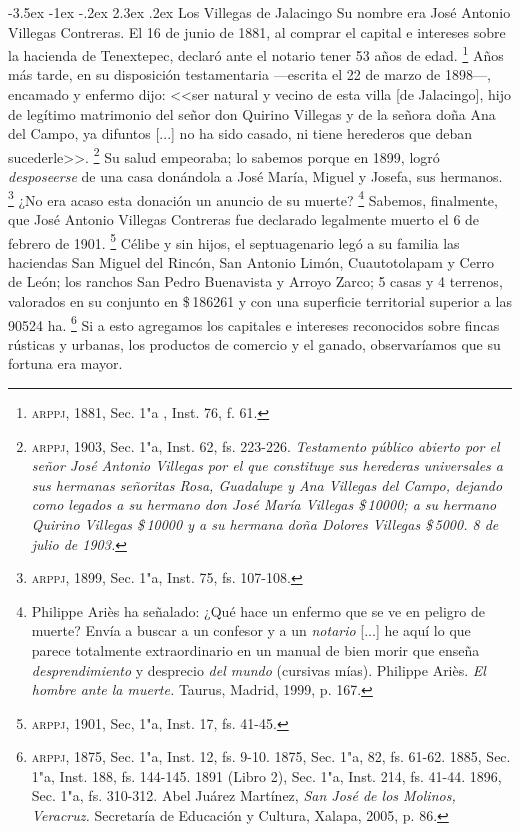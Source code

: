 \documentclass[14pt,twoside,final]{extbook} %
\makeatletter
\let\oldfootnote\footnote
\renewcommand\footnote[1]{%
\oldfootnote{\hspace{1mm}#1}}
\renewcommand\section{\@startsection {section}{1}{\z@}%
                                     {-3.5ex \@plus -1ex \@minus -.2ex}%
                                     {2.3ex \@plus .2ex}%
                                     {\normalfont\large\bfseries\sc}}
\makeatother
\begin{document}
\section{Los Villegas de Jalacingo}\label{sec:Villegas-Jalacingo}
Su nombre era José Antonio Villegas Contreras. El 16 de junio de 1881, al comprar el capital e intereses sobre la hacienda de Tenextepec, declaró ante el notario tener 53 años de edad.\footnote{\textsc{arppj}, 1881, Sec. 1"a , Inst. 76, f. 61.} Años más tarde, en su disposición testamentaria ---escrita el 22 de marzo de 1898---, encamado y enfermo dijo: <<ser natural y vecino de esta villa [de Jalacingo], hijo de legítimo matrimonio del señor don Quirino Villegas y de la señora doña Ana del Campo, ya difuntos [...] no ha sido casado, ni tiene herederos que deban sucederle>>.\footnote{\textsc{arppj}, 1903, Sec. 1"a, Inst. 62, fs. 223-226. \emph{Testamento público abierto por el señor José Antonio Villegas por el que constituye sus herederas universales a sus hermanas señoritas Rosa, Guadalupe y Ana Villegas del Campo, dejando como legados a su hermano don José María Villegas \$\,10000; a su hermano Quirino Villegas \$\,10000 y a su hermana doña Dolores Villegas \$\,5000. 8 de julio de 1903.}} Su salud empeoraba; lo sabemos porque en 1899, logró \emph{desposeerse} de una casa donándola a José María, Miguel y Josefa, sus hermanos.\footnote{\textsc{arppj}, 1899, Sec. 1"a, Inst. 75, fs. 107-108.} ¿No era acaso esta donación un anuncio de su muerte?\footnote{Philippe Ariès ha señalado: ¿Qué hace un enfermo que se ve en peligro de muerte? Envía a buscar a un confesor y a un \emph{notario} [...] he aquí lo que parece totalmente extraordinario en un manual de bien morir que enseña \emph{desprendimiento} y desprecio \emph{del mundo} (cursivas mías). Philippe Ariès. \emph{El hombre ante la muerte.} Taurus, Madrid, 1999, p. 167.} Sabemos, finalmente, que José Antonio Villegas Contreras fue declarado legalmente muerto el 6 de febrero de 1901.\footnote{\textsc{arppj}, 1901, Sec, 1"a, Inst. 17, fs. 41-45.} Célibe y sin hijos, el septuagenario legó a su familia las haciendas San Miguel del Rincón, San Antonio Limón, Cuautotolapam y Cerro de León; los ranchos San Pedro Buenavista y Arroyo Zarco; 5 casas y 4 terrenos, valorados en su conjunto en \$\,186261 y con una superficie territorial superior a las 90524 ha.\footnote{\textsc{arppj}, 1875, Sec. 1"a, Inst. 12, fs. 9-10. 1875, Sec. 1"a, 82, fs. 61-62. 1885, Sec. 1"a, Inst. 188, fs. 144-145. 1891 (Libro 2), Sec. 1"a, Inst. 214, fs. 41-44. 1896, Sec. 1"a, fs. 310-312. Abel Juárez Martínez, \emph{San José de los Molinos, Veracruz.} Secretaría de Educación y Cultura, Xalapa, 2005, p. 86.} Si a esto agregamos los capitales e intereses reconocidos sobre fincas rústicas y urbanas, los productos de comercio y el ganado, observaríamos que su fortuna era mayor.
\end{document}
